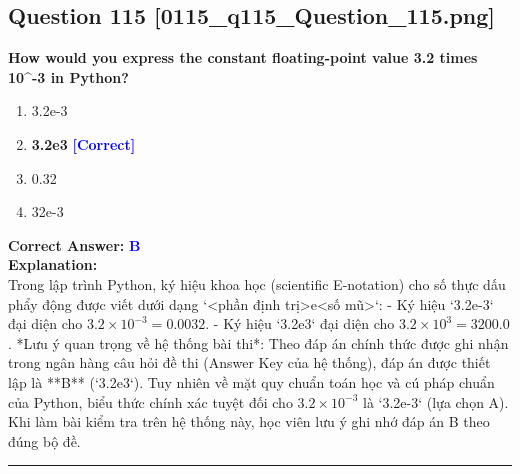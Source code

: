 \documentclass[11pt,a4paper]{article}
\begin{document}
\begin{minipage}{\textwidth}
\subsection*{Question 115 \quad \footnotesize{[0115_q115_Question_115.png]}}
\noindent \textbf{How would you express the constant floating-point value 3.2 times 10^-3 in Python?}

\begin{enumerate}[label=\Alph*.]
    \item 3.2e-3
    \item \textbf{3.2e3} \hfill \textcolor{blue}{\textbf{[Correct]}}
    \item 0.32
    \item 32e-3
\end{enumerate}

\noindent \textbf{Correct Answer:} \textcolor{blue}{\textbf{B}} \\[4pt]
\noindent \textbf{Explanation:}\\
Trong lập trình Python, ký hiệu khoa học (scientific E-notation) cho số thực dấu phẩy động được viết dưới dạng `<phần định trị>e<số mũ>`:\newline
- Ký hiệu `3.2e-3` đại diện cho $3.2 \times 10^{-3} = 0.0032$.\newline
- Ký hiệu `3.2e3` đại diện cho $3.2 \times 10^{3} = 3200.0$.\newline
*Lưu ý quan trọng về hệ thống bài thi*: Theo đáp án chính thức được ghi nhận trong ngân hàng câu hỏi đề thi (Answer Key của hệ thống), đáp án được thiết lập là **B** (`3.2e3`). Tuy nhiên về mặt quy chuẩn toán học và cú pháp chuẩn của Python, biểu thức chính xác tuyệt đối cho $3.2 \times 10^{-3}$ là `3.2e-3` (lựa chọn A). Khi làm bài kiểm tra trên hệ thống này, học viên lưu ý ghi nhớ đáp án B theo đúng bộ đề.
\end{minipage}
\vspace{0.8cm}
\hrule
\vspace{0.5cm}
\end{document}
